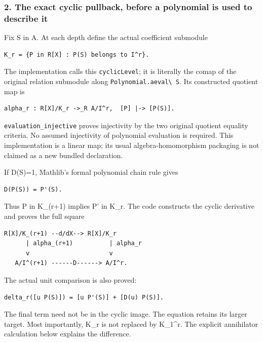 \subsubsection{2. The exact cyclic pullback, before a polynomial is used to describe
it}\label{conormal_cyclic_pr21:the-exact-cyclic-pullback-before-a-polynomial-is-used-to-describe-it}

Fix S in A. At each depth define the actual coefficient submodule

\begin{verbatim}
K_r = {P in R[X] : P(S) belongs to I^r}.
\end{verbatim}

The implementation calls this \nolinkurl{cyclicLevel}; it is literally the comap of the original
relation submodule along \nolinkurl{Polynomial.aeval\ S}. Its constructed quotient map is

\begin{verbatim}
alpha_r : R[X]/K_r ->_R A/I^r,  [P] |-> [P(S)].
\end{verbatim}

\nolinkurl{evaluation_injective} proves injectivity by the two original quotient equality criteria. No
assumed injectivity of polynomial evaluation is required. This implementation is a linear map; its
usual algebra-homomorphism packaging is not claimed as a new bundled declaration.

If D(S)=1, Mathlib's formal polynomial chain rule gives

\begin{verbatim}
D(P(S)) = P'(S).
\end{verbatim}

Thus P in K\_(r+1) implies P' in K\_r. The code constructs the cyclic derivative and proves the full
square

\begin{verbatim}
R[X]/K_(r+1) --d/dX--> R[X]/K_r
      | alpha_(r+1)          | alpha_r
      v                      v
   A/I^(r+1) ------D------> A/I^r.
\end{verbatim}

The actual unit comparison is also proved:

\begin{verbatim}
delta_r([u P(S)]) = [u P'(S)] + [D(u) P(S)].
\end{verbatim}

The final term need not be in the cyclic image. The equation retains its larger target. Most
importantly, K\_r is not replaced by K\_1\^{}r. The explicit annihilator calculation below explains
the difference.

